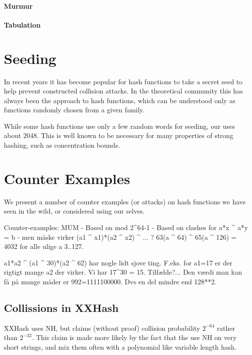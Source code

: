 \paragraph{Murmur}
\paragraph{Tabulation}



\section{Seeding}

In recent years it has become popular for hash functions to take a secret seed
to help prevent constructed collision attacks.
In the theoretical community this has always been the approach to hash functions,
which can be understood only as functions randomly chosen from a given family.

While some hash functions use only a few random words for seeding, our uses about 2048.
This is well known to be necessary for many properties of strong hashing, such as concentration bounds.

   

\section{Counter Examples}

We present a number of counter examples (or attacks) on hash functions we have seen in the wild, or considered using our selves.

Counter-examples:
MUM
   - Based on mod 2^64-1
   - Based on clashes for a*x ^ a*y = b
   - men måske virker (a1 ^ x1)*(a2 ^ x2) ^ ... ?
   63(a ^ 64) ^ 65(a ^ 126) = 4032
   for alle ulige a 3..127.


   a1*a2 ^ (a1 ^ 30)*(a2 ^ 62)
   har nogle lidt sjove ting. F.eks. for a1=17 er der rigtigt mange a2 der virker.
   Vi har 17^30 = 15. Tilfælde?...
   Den værdi man kan få på mange måder er 992=1111100000. Dvs en del mindre end 128**2.

\subsection{Collissions in XXHash}
XXHash uses NH, but claims (without proof) collision probability $2^{-64}$ rather than $2^{-32}$.
This claim is made more likely by the fact that the use NH on very short strings, and mix them often with a polynomial like variable length hash.

